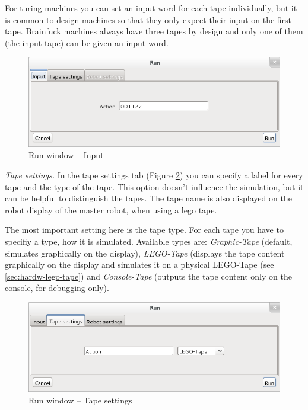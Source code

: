 \documentclass[%
  a4paper,%
  11pt,%
  blue,%
  hyperref	%
  ]{tubsartcl}
\begin{document}
For turing machines you can set an input word for each tape individually, but it is common to design machines so that they only expect their input on the first tape. Brainfuck machines always have three tapes by design and only one of them (the input tape) can be given an input word.

\begin{figure}[!htb]
\begin{center}
\includegraphics[scale=0.5]{graphics_gui/run_window_input.png}
\end{center}
\caption{Run window -- Input}
\label{pic:run_window_input}
\end{figure}

\emph{Tape settings.} In the tape settings tab (Figure \ref{pic:run_window_tape_settings}) you can specify a label for every tape and the type of the tape. This option doesn't influence the simulation, but it can be helpful to distinguish the tapes. The tape name is also displayed on the robot display of the master robot, when using a lego tape.

The most important setting here is the tape type. For each tape you have to specifiy a type, how it is simulated. Available types are: \emph{Graphic-Tape} (default, simulates graphically on the display), \emph{LEGO-Tape} (displays the tape content graphically on the display and simulates it on a physical LEGO-Tape (see \ref{sec:hardw-lego-tape}) and \emph{Console-Tape} (outputs the tape content only on the console, for debugging only).

\begin{figure}[!htb]
\begin{center}
\includegraphics[scale=0.5]{graphics_gui/run_window_tape_settings.png}
\end{center}
\caption{Run window -- Tape settings}
\label{pic:run_window_tape_settings}
\end{figure}
\end{document}
